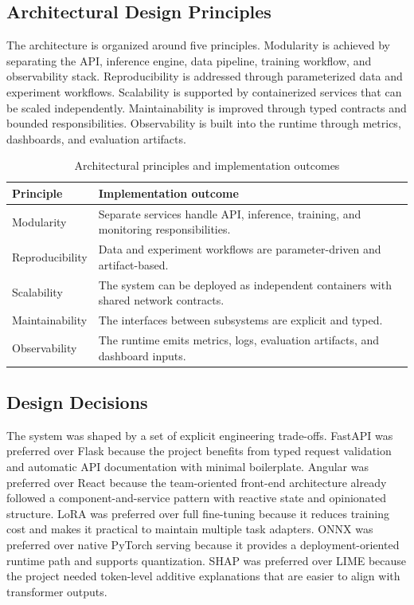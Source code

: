 \documentclass[12pt, a4paper]{article}
\begin{document}
\subsection{Architectural Design Principles}
The architecture is organized around five principles. Modularity is achieved by separating the API, inference engine, data pipeline, training workflow, and observability stack. Reproducibility is addressed through parameterized data and experiment workflows. Scalability is supported by containerized services that can be scaled independently. Maintainability is improved through typed contracts and bounded responsibilities. Observability is built into the runtime through metrics, dashboards, and evaluation artifacts.

\begin{table}[H]
\centering
\caption{Architectural principles and implementation outcomes}
\begin{tabularx}{\textwidth}{@{} p{3.1cm} X @{}}
\toprule
\textbf{Principle} & \textbf{Implementation outcome} \\
\midrule
Modularity & Separate services handle API, inference, training, and monitoring responsibilities. \\
Reproducibility & Data and experiment workflows are parameter-driven and artifact-based. \\
Scalability & The system can be deployed as independent containers with shared network contracts. \\
Maintainability & The interfaces between subsystems are explicit and typed. \\
Observability & The runtime emits metrics, logs, evaluation artifacts, and dashboard inputs. \\
\bottomrule
\end{tabularx}
\end{table}

\subsection{Design Decisions}
The system was shaped by a set of explicit engineering trade-offs. FastAPI was preferred over Flask because the project benefits from typed request validation and automatic API documentation with minimal boilerplate. Angular was preferred over React because the team-oriented front-end architecture already followed a component-and-service pattern with reactive state and opinionated structure. LoRA was preferred over full fine-tuning because it reduces training cost and makes it practical to maintain multiple task adapters. ONNX was preferred over native PyTorch serving because it provides a deployment-oriented runtime path and supports quantization. SHAP was preferred over LIME because the project needed token-level additive explanations that are easier to align with transformer outputs.
\end{document}
